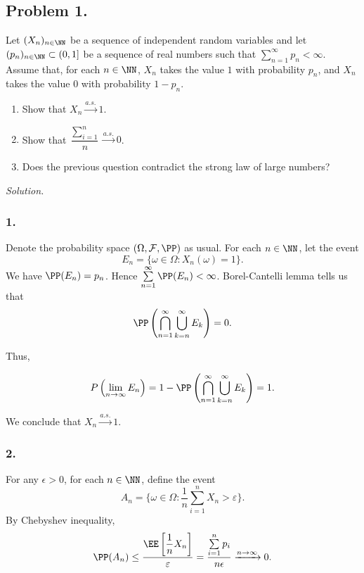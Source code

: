 \subsection*{Problem 1.} Let $(X_n)_{n\in\NN}$ be a sequence of independent random variables and let $(p_n)_{n\in\NN}\subset (0,1]$ be a sequence of real numbers such that $\sum\limits_{n=1}^\infty p_n < \infty$. Assume that, for each $n\in\NN$, $X_n$ takes the value $1$ with probability $p_n$, and $X_n$ takes the value $0$ with probability $1-p_n$.

\begin{enumerate}
    \item Show that $X_n\xrightarrow{a.s.} 1$.
    \item Show that $\dfrac{\sum\limits_{i=1}^n}{n}\xrightarrow{a.s.} 0$.
    \item Does the previous question contradict the strong law of large numbers?
\end{enumerate}

\textit{Solution.}

\subsubsection*{1.} Denote the probability space $(\Omega, \mathcal{F}, \PP)$ as usual. For each $n\in\NN$, let the event
$$E_n=\{\omega\in\Omega : X_n(\omega) = 1\}.$$
We have $\PP(E_n) = p_n$. Hence $\sum\limits_{n=1}^\infty \PP(E_n) < \infty$. Borel-Cantelli lemma tells us that
$$\PP\left(\bigcap\limits_{n=1}^\infty\bigcup\limits_{k=n}^\infty E_k\right) = 0.$$

Thus,

$$P\left(\lim\limits_{n\to\infty} E_n\right) = 1 - \PP\left(\bigcap\limits_{n=1}^\infty\bigcup\limits_{k=n}^\infty E_k\right) = 1.$$

We conclude that $X_n\xrightarrow{a.s.} 1$.

\subsubsection*{2.} For any $\epsilon>0$, for each $n\in\NN$, define the event
$$A_n = \{\omega\in\Omega : \dfrac{1}{n}\sum\limits_{i=1}^n X_n > \varepsilon\}.$$
By Chebyshev inequality,
\begin{align*}
    \PP(A_n) \le \dfrac{\EE\left[\dfrac{1}{n}X_n\right]}{\varepsilon} = \dfrac{\sum\limits_{i=1}^np_i}{n\epsilon} \xrightarrow{n\to\infty} 0.
\end{align*}


